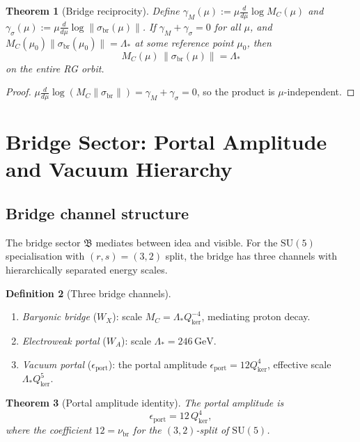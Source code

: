 \documentclass[12pt]{article}
\theoremstyle{plain}
\newtheorem{theorem}{Theorem}[section]
\theoremstyle{definition}
\newtheorem{definition}[theorem]{Definition}
\numberwithin{equation}{section}
\newcommand{\fB}{\mathfrak{B}}
\newcommand{\br}{\mathrm{br}}
\newcommand{\kker}{\mathrm{ker}}
\begin{document}
\begin{theorem}[Bridge reciprocity]\label{thm:reciprocity}
Define $\gamma_M(\mu):=\mu\frac{d}{d\mu}\log M_C(\mu)$ and $\gamma_\sigma(\mu):=\mu\frac{d}{d\mu}\log\|\sigma_{\br}(\mu)\|$.  If $\gamma_M+\gamma_\sigma=0$ for all $\mu$, and $M_C(\mu_0)\|\sigma_{\br}(\mu_0)\|=\Lambda_*$ at some reference point $\mu_0$, then
\begin{equation}
\boxed{M_C(\mu)\,\|\sigma_{\br}(\mu)\| = \Lambda_*}
\end{equation}
on the entire RG orbit.
\end{theorem}

\begin{proof}
$\mu\frac{d}{d\mu}\log(M_C\|\sigma_{\br}\|)=\gamma_M+\gamma_\sigma=0$, so the product is $\mu$-independent.
\end{proof}


\section{Bridge Sector: Portal Amplitude and Vacuum Hierarchy}\label{sec:bridge}

\subsection{Bridge channel structure}

The bridge sector $\fB$ mediates between idea and visible.  For the $\mathrm{SU}(5)$ specialisation with $(r,s)=(3,2)$ split, the bridge has three channels with hierarchically separated energy scales.

\begin{definition}[Three bridge channels]
\begin{enumerate}[label=(\roman*)]
\item \emph{Baryonic bridge} ($W_X$): scale $M_C=\Lambda_* Q_{\kker}^{-4}$, mediating proton decay.
\item \emph{Electroweak portal} ($W_A$): scale $\Lambda_*=246\,\mathrm{GeV}$.
\item \emph{Vacuum portal} ($\epsilon_{\mathrm{port}}$): the portal amplitude $\epsilon_{\mathrm{port}}=12Q_{\kker}^4$, effective scale $\Lambda_* Q_{\kker}^5$.
\end{enumerate}
\end{definition}

\begin{theorem}[Portal amplitude identity]\label{thm:portal}
The portal amplitude is
\begin{equation}
\boxed{\epsilon_{\mathrm{port}} = 12\,Q_{\kker}^4,}
\end{equation}
where the coefficient $12=\nu_{\br}$ for the $(3,2)$-split of $\mathrm{SU}(5)$.
\end{theorem}
\end{document}
